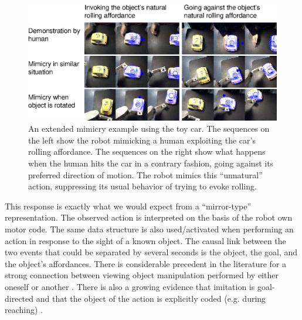 \begin{figure}[tbh]
\begin{center}
\includegraphics[width=\textwidth]{fig-mimicry-awkward.eps}
\caption{ 
\label{fig:mimicked-action}
%
An extended mimicry example using the toy car.
The sequences on the left show the robot mimicking a human exploiting
the car's rolling affordance.  The sequences on the right show
what happens when the human hits the car in a contrary fashion, going
against its preferred direction of motion.  The robot mimics this 
``unnatural'' action, suppressing its usual behavior of trying to
evoke rolling.
%
}
\end{center}
\end{figure}

This response is exactly what we would expect from a ``mirror-type'' representation.
The observed action is interpreted on the basis of the robot own motor code. The same
data structure is also used/activated when performing an action in response to the
sight of a known object. The causal link between the two events that could be separated
by several seconds is the object, the goal, and the object's affordances. There is 
considerable precedent in the literature for a strong connection between viewing 
object manipulation performed by either oneself or another \cite{wohlsclager02human}.
There is also a growing evidence that imitation is goal-directed 
\cite{bekkering-wohlschlager-2000} and that the object of the action is explicitly 
coded (e.g. during reaching) \cite{woodward-1998}.



